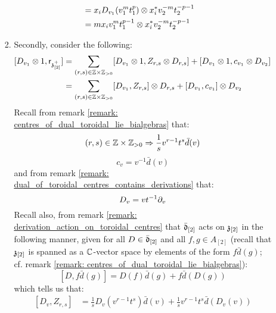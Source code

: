 \begin{remark}
\begin{enumerate}
\begin{enumerate}
\begin{enumerate}
$$\begin{aligned}
                                        \\
                                        & = x_i D_{v_1}(v_1^m t_1^p) \tensor x_i^* v_2^{-m} t_2^{-p - 1}
                                        \\
                                        & = m x_i v_1^m t_1^{p - 1} \tensor x_i^* v_2^{-m} t_2^{-p - 1}
                                    \end{aligned}
                                $$
                            \item Secondly, consider the following:
                                $$
                                    \begin{aligned}
                                        [D_{v_1} \tensor 1, \sfr_{\z_{[2]}^+}] & = \sum_{(r, s) \in \Z \x \Z_{> 0}} [D_{v_1} \tensor 1, Z_{r, s} \tensor D_{r, s}] + [D_{v_1} \tensor 1, c_{v_1} \tensor D_{v_2}]
                                        \\
                                        & = \sum_{(r, s) \in \Z \x \Z_{> 0}} [D_{v_1}, Z_{r, s}] \tensor D_{r, s} + [D_{v_1}, c_{v_1}] \tensor D_{v_2}
                                    \end{aligned}
                                $$
                            Recall from remark \ref{remark: centres_of_dual_toroidal_lie_bialgebras} that:
                                $$(r, s) \in \Z \x \Z_{> 0} \implies \frac1s v^{r - 1} t^s \bar{d}(v)$$
                                $$c_v = v^{-1} \bar{d}(v)$$
                            and from remark \ref{remark: dual_of_toroidal_centres_contains_derivations} that:
                                $$D_v = v t^{-1} \del_v$$
                            Recall also, from remark \ref{remark: derivation_action_on_toroidal_centres} that $\bar{\d}_{[2]}$ acts on $\z_{[2]}$ in the following manner, given for all $D \in \bar{\d}_{[2]}$ and all $f, g \in A_{[2]}$ (recall that $\z_{[2]}$ is spanned as a $\bbC$-vector space by elements of the form $f \bar{d}(g)$; cf. remark \ref{remark: centres_of_dual_toroidal_lie_bialgebras}):
                                $$[D, f \bar{d}(g)] = D(f) \bar{d}(g) + f \bar{d}( D(g) )$$
                            which tells us that:
                                $$
                                    \begin{aligned}
                                        [D_v, Z_{r, s}] & = \frac1s D_v( v^{r - 1} t^s ) \bar{d}(v) + \frac1s v^{r - 1} t^s \bar{d}(D_v(v))
                                        \\

\end{aligned}$$
\end{enumerate}
\end{enumerate}
\end{enumerate}
\end{remark}
